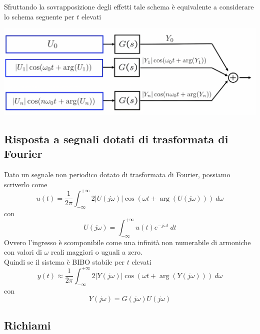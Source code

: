 \documentclass{article}
\numberwithin{equation}{subsection}
\let\oldsubsection\subsection%
\renewcommand{\subsection}{%
  \renewcommand{\theequation}{\thesubsection.\arabic{equation}}%
  \oldsubsection}%
\begin{document}
Sfruttando la sovrapposizione degli effetti tale schema è equivalente a considerare lo schema seguente per $t$ elevati
\begin{center}
    \includegraphics[scale=0.11]{Images/Fourier_2.png}
\end{center}



\subsection{Risposta a segnali dotati di trasformata di Fourier}
Dato un segnale non periodico dotato di trasformata di Fourier, possiamo scriverlo come
\begin{equation}
    u(t) = \frac{1}{2\pi} \int_{- \infty}^{+\infty} 2|U(j\omega)| \cos(\omega t + \arg(U(j\omega))) \ d\omega
\end{equation}
con 
\[
    U(j\omega) = \int_{-\infty}^{+\infty} u(t) e^{-j \omega t} \ dt
\]
Ovvero l'ingresso è scomponibile come una infinità non numerabile di armoniche con valori di $\omega$ reali maggiori o uguali a zero.
\vspace*{0.1cm}\\
Quindi se il sistema è BIBO stabile per $t$ elevati
\begin{equation}
    y(t) \approx \frac{1}{2 \pi} \int_{- \infty}^{+\infty} 2|Y(j\omega)| \cos(\omega t + \arg(Y(j\omega))) \ d\omega
\end{equation}
con 
\[
    Y(j\omega) = G(j \omega)U(j\omega)    
\]



\subsection{Richiami}
\end{document}
